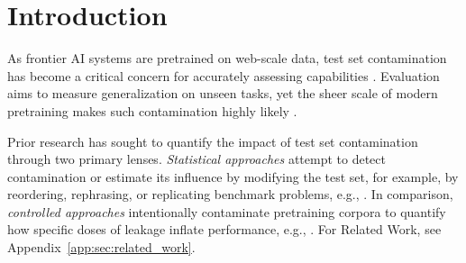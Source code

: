 \section{Introduction}
\label{sec:introduction}

As frontier AI systems are pretrained on web-scale data, test set contamination has become a critical concern for accurately assessing capabilities \citep{sainz2023nlp,schaeffer2023pretrainingtestsetneed,xu2024benchmarkdatacontaminationlarge,deng2024unveiling,reuel2025open}.
Evaluation aims to measure generalization on unseen tasks, yet the sheer scale of modern pretraining makes such contamination highly likely \citep{brown2020language, du2022glam, wei2022finetuned,chowdhery2022palmscalinglanguagemodeling,touvron2023llama2openfoundation, penedo2024finewebdatasetsdecantingweb}.

Prior research has sought to quantify the impact of test set contamination through two primary lenses. \textit{Statistical approaches} attempt to detect contamination or estimate its influence by modifying the test set, for example, by reordering, rephrasing, or replicating benchmark problems, e.g., \citep{oren2023proving, ni2025trainingbenchmarkneed, shi2024detecting, golchin2023data,golchin2024time,roberts2024to, wang2025generalization, zhang2024carefulexaminationlargelanguage}.
In comparison, \textit{controlled approaches} intentionally contaminate pretraining corpora to quantify how specific doses of leakage inflate performance, e.g., \citep{magar2022data,jiang2024investigatingdatacontaminationpretraining,oren2023proving,yao2024data, duan2024membership,wang2025generalization,kocyigit2025overestimation,bordt2025howmuch, wei2025hubblemodelsuiteadvance}.
For Related Work, see Appendix~\ref{app:sec:related_work}.

